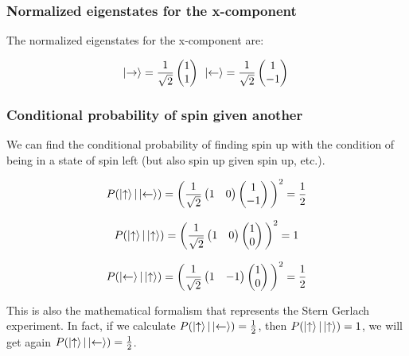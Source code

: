 		\subsubsection{Normalized eigenstates for the x-component}
		The normalized eigenstates for the x-component are:

		$$\ket{\rightarrow}=\frac{1}{\sqrt{2}}\begin{pmatrix}1\\1\end{pmatrix}\;\,\ket{\leftarrow}=\frac{1}{\sqrt{2}}\begin{pmatrix}1\\-1\end{pmatrix}\,$$

		\subsubsection{Conditional probability of spin given another}
		We can find the conditional probability of finding spin up with the condition of being in a state of spin left (but also spin up given spin up, etc.).

		$$P(\ket{\uparrow}|\ket{\leftarrow})=\bigg(\frac{1}{\sqrt{2}}\begin{pmatrix}1&0\end{pmatrix}\begin{pmatrix}1\\-1\end{pmatrix}\bigg)^2=\frac{1}{2}$$

		$$P(\ket{\uparrow}|\ket{\uparrow})=\bigg(\frac{1}{\sqrt{2}}\begin{pmatrix}1&0\end{pmatrix}\begin{pmatrix}1\\0\end{pmatrix}\bigg)^2=1$$

		$$P(\ket{\leftarrow}|\ket{\uparrow})=\bigg(\frac{1}{\sqrt{2}}\begin{pmatrix}1&-1\end{pmatrix}\begin{pmatrix}1\\0\end{pmatrix}\bigg)^2=\frac{1}{2}$$

		This is also the mathematical formalism that represents the Stern Gerlach experiment.
		In fact, if we calculate $P(\ket{\uparrow}|\ket{\leftarrow}) = \frac{1}{2}$, then $P(\ket{\uparrow}|\ket{\uparrow}) = 1$, we will get again $P(\ket{\uparrow}|\ket{\leftarrow}) = \frac{1}{2}$.

